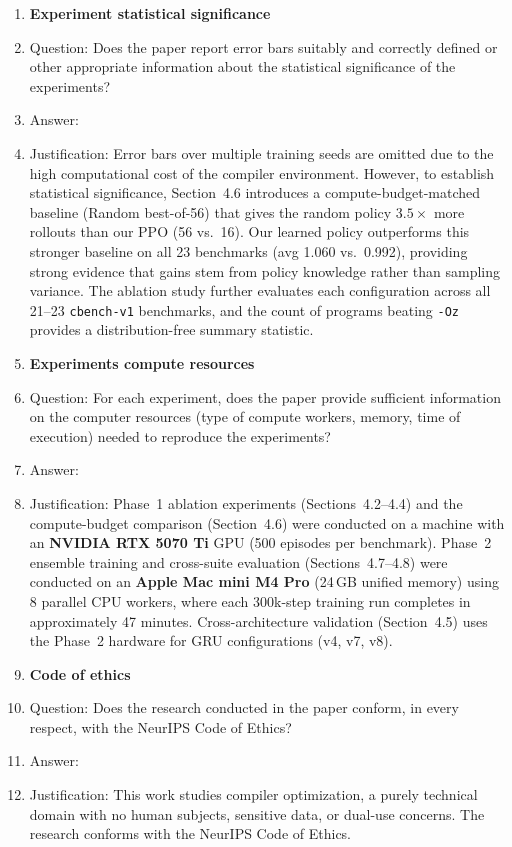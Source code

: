 \begin{enumerate}
\item {\bf Experiment statistical significance}
    \item[] Question: Does the paper report error bars suitably and correctly defined or other appropriate information about the statistical significance of the experiments?
    \item[] Answer: \answerNo{}
    \item[] Justification: Error bars over multiple training seeds are omitted due to the high computational cost of the compiler environment. However, to establish statistical significance, Section~4.6 introduces a compute-budget-matched baseline (Random best-of-56) that gives the random policy $3.5\times$ more rollouts than our PPO (56 vs.\ 16). Our learned policy outperforms this stronger baseline on all 23 benchmarks (avg 1.060 vs.\ 0.992), providing strong evidence that gains stem from policy knowledge rather than sampling variance. The ablation study further evaluates each configuration across all 21--23 \texttt{cbench-v1} benchmarks, and the count of programs beating \texttt{-Oz} provides a distribution-free summary statistic.

\item {\bf Experiments compute resources}
    \item[] Question: For each experiment, does the paper provide sufficient information on the computer resources (type of compute workers, memory, time of execution) needed to reproduce the experiments?
    \item[] Answer: \answerYes{}
    \item[] Justification: Phase~1 ablation experiments (Sections~4.2--4.4) and the compute-budget comparison (Section~4.6) were conducted on a machine with an \textbf{NVIDIA RTX 5070 Ti} GPU (500 episodes per benchmark). Phase~2 ensemble training and cross-suite evaluation (Sections~4.7--4.8) were conducted on an \textbf{Apple Mac mini M4 Pro} (24\,GB unified memory) using 8 parallel CPU workers, where each 300k-step training run completes in approximately 47 minutes. Cross-architecture validation (Section~4.5) uses the Phase~2 hardware for GRU configurations (v4, v7, v8).

\item {\bf Code of ethics}
    \item[] Question: Does the research conducted in the paper conform, in every respect, with the NeurIPS Code of Ethics?
    \item[] Answer: \answerYes{}
    \item[] Justification: This work studies compiler optimization, a purely technical domain with no human subjects, sensitive data, or dual-use concerns. The research conforms with the NeurIPS Code of Ethics.


\end{enumerate}
